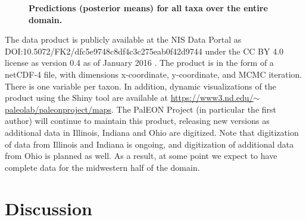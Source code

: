 \documentclass[10pt,letterpaper]{article}
\begin{document}
\begin{figure}

\caption{{\bf Predictions (posterior means) for all taxa over the entire domain.}}
\label{fig:all_predictions}

\end{figure}


The data product is publicly available at the NIS
Data Portal as DOI:10.5072/FK2/dfc5e9748c8df4c3c275eab0f42d9744 under
the CC BY 4.0 license as version 0.4 as of January 2016 \cite{paci:etal:data:2016}.
The product is in the form of a netCDF-4 file, with dimensions x-coordinate,
y-coordinate, and MCMC iteration. There is one variable per taxon.
In addition, dynamic visualizations of the product using the Shiny
tool are available at \href{https://www3.nd.edu/~paleolab/paleonproject/maps}{https://www3.nd.edu/$\sim$paleolab/paleonproject/maps}.
The PalEON Project (in particular the first author) will continue
to maintain this product, releasing new versions as additional data
in Illinois, Indiana and Ohio are digitized. Note that digitization
of data from Illinois and Indiana is ongoing, and digitization of
additional data from Ohio is planned as well. As a result, at some
point we expect to have complete data for the midwestern half of the
domain. 


\section*{Discussion}\label{sec:Discussion}
\end{document}
